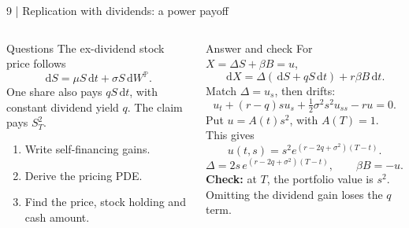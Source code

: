 \documentclass[handout,10pt,t,aspectratio=169]{beamer}
\newcommand{\Pp}{\mathbb P}
\newcommand{\dd}{\,\mathrm d}
\newenvironment{questions}{\begin{block}{Questions}}{\end{block}}
\newenvironment{answers}{\begin{exampleblock}{Answer and check}}{\end{exampleblock}}
\newcommand{\compact}{\small%
 \setlength{\abovedisplayskip}{3pt}%
 \setlength{\belowdisplayskip}{3pt}%
 \setlength{\abovedisplayshortskip}{2pt}%
 \setlength{\belowdisplayshortskip}{2pt}%
 \setlength{\parskip}{2pt}}
\begin{document}
\begin{frame}{9 | Replication with dividends: a power payoff}
\compact
\begin{columns}[T,onlytextwidth]
\begin{questions}
The ex-dividend stock price follows
\[
 \dd S=\mu S\dd t+\sigma S\dd W^\Pp.
\]
One share also pays \(qS\dd t\), with constant dividend yield \(q\).
The claim pays \(S_T^2\).
\begin{enumerate}
\item Write self-financing gains.
\item Derive the pricing PDE.
\item Find the price, stock holding and cash amount.
\end{enumerate}
\end{questions}
\begin{answers}
For \(X=\Delta S+\beta B=u\),
\[
 \dd X=\Delta(\dd S+qS\dd t)+r\beta B\dd t.
\]
Match \(\Delta=u_s\), then drifts:
\[
 u_t+(r-q)su_s+\tfrac12\sigma^2s^2u_{ss}-ru=0.
\]
Put \(u=A(t)s^2\), with \(A(T)=1\). This gives
\[
 \boxed{u(t,s)=s^2e^{(r-2q+\sigma^2)(T-t)}.}
\]
\[
 \Delta=2s\,e^{(r-2q+\sigma^2)(T-t)},\qquad \beta B=-u.
\]
\textbf{Check:} at \(T\), the portfolio value is \(s^2\).
Omitting the dividend gain loses the \(q\) term.
\end{answers}
\end{columns}
\end{frame}
\end{document}

